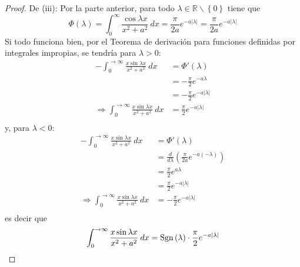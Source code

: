 \documentclass[12pt]{report}
\theoremstyle{largebreak}
\newcommand\abs[1]{\ensuremath{\left|#1\right|}}
\newcommand{\Sgn}[1]{\ensuremath{\textup{Sgn}\left(#1\right)}}
\begin{document}
\begin{proof}
        De (iii): Por la parte anterior, para todo $\lambda\in\mathbb{R}\backslash\left\{0\right\}$ tiene que 
        \begin{equation*}
            \Phi(\lambda)=\int_{0}^{\infty}\frac{\cos\lambda x}{x^2+a^2}\:dx=\frac{\pi}{2a}e^{ -a\abs{\lambda}}=\frac{\pi}{2a}e^{-a\abs{\lambda}}
        \end{equation*}
        Si todo funciona bien, por el Teorema de derivación para funciones definidas por integrales impropias, se tendría para $\lambda>0$:
        \begin{equation*}
            \begin{split}
                -\int_0^{\rightarrow\infty}\frac{x\sin\lambda x}{x^2+a^2}\:dx&=\Phi'(\lambda)\\
                &=-\frac{\pi}{2}e^{-a\lambda}\\
                &=-\frac{\pi}{2}e^{-a\abs{\lambda}}\\
                \Rightarrow \int_0^{\rightarrow\infty}\frac{x\sin\lambda x}{x^2+a^2}\:dx&=\frac{\pi}{2}e^{-a\abs{\lambda}}\\
            \end{split}
        \end{equation*}
        y, para $\lambda<0$:
        \begin{equation*}
            \begin{split}
                -\int_0^{\rightarrow\infty}\frac{x\sin\lambda x}{x^2+a^2}\:dx&=\Phi'(\lambda)\\
                &=\frac{d}{d\lambda}\left(\frac{\pi}{2a}e^{-a(-\lambda)}\right) \\
                &=\frac{\pi}{2}e^{a\lambda}\\
                &=\frac{\pi}{2}e^{-a\abs{\lambda}}\\
                \Rightarrow \int_0^{\rightarrow\infty}\frac{x\sin\lambda x}{x^2+a^2}\:dx&=-\frac{\pi}{2}e^{-a\abs{\lambda}}\\
            \end{split}
        \end{equation*}
        es decir que
        \begin{equation*}
            \int_0^{\rightarrow\infty}\frac{x\sin\lambda x}{x^2+a^2}\:dx=\Sgn{\lambda}\cdot\frac{\pi}{2}e^{ -a\abs{\lambda}}
        \end{equation*}
    \end{proof}
\end{document}
